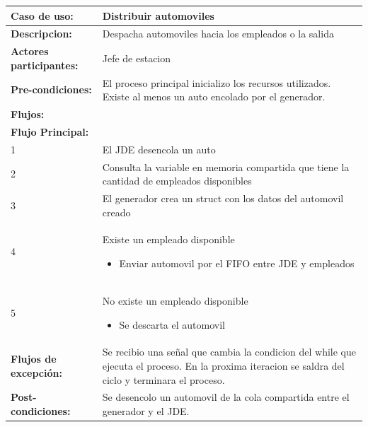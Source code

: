 \documentclass[12pt,a4paper,spanish]{article}
\begin{document}
	\begin{tabular}{|p{4cm}|p{12cm}|}
    \hline
    \textbf{Caso de uso:} & Distribuir automoviles \\
    \hline
    \textbf{Descripcion:} &  Despacha automoviles hacia los empleados o la salida\\
    \hline
    \textbf{Actores participantes:} & Jefe de estacion  \\
    \hline
 
    \textbf{Pre-condiciones:} &  El proceso principal inicializo los recursos utilizados. Existe 
    al menos un auto encolado por el generador.\\
    \hline
    \hline
    \textbf{Flujos:} &\\
    \hline
	\textbf{Flujo Principal:} &\\ 

	\hline
	1 & El JDE desencola un auto\\
	\hline
	2 & Consulta la variable en memoria compartida que tiene la cantidad de empleados disponibles\\
	\hline
	3 & El generador crea un struct con los datos del automovil creado\\
	\hline
	4 & Existe un empleado disponible
		\begin{itemize}
			\item Enviar automovil por el FIFO entre JDE y empleados 
		\end{itemize}
		\\
	\hline
	5 & No existe un empleado disponible
		\begin{itemize}
			\item Se descarta el automovil
		\end{itemize}
		\\
	\hline
	\hline
	\textbf{Flujos de excepción:} & Se recibio una señal que cambia la condicion del while que ejecuta el proceso. En la proxima iteracion se saldra del ciclo y terminara el proceso.\\
    \hline

    \hline
	\textbf{Post-condiciones:} & Se desencolo un automovil de la cola compartida entre el generador y el JDE.\\
	\hline
	\end{tabular}

	\newpage
\end{document}
